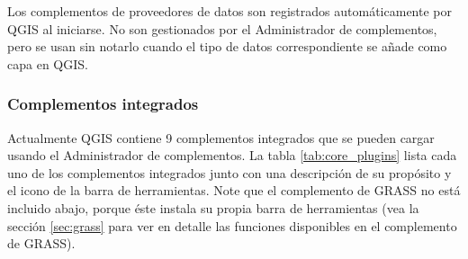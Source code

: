 Los complementos de proveedores de datos son registrados automáticamente por QGIS al iniciarse. No son gestionados por el Administrador de complementos, pero se usan sin notarlo cuando el tipo de datos correspondiente se añade como capa en QGIS.

\subsubsection{Complementos integrados}\label{sec:core_plugins}

Actualmente QGIS contiene 9 complementos integrados que se pueden cargar usando el Administrador de complementos. La tabla \ref{tab:core_plugins} lista cada uno de los complementos integrados junto con una descripción de su propósito y el icono de la barra de herramientas. Note que el complemento de GRASS no está incluido abajo, porque éste instala su propia barra de herramientas (vea la sección \ref{sec:grass} para ver en detalle las funciones disponibles en el complemento de GRASS).

